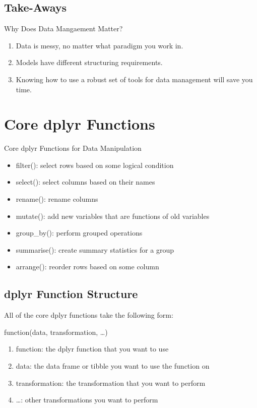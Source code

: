 \documentclass[]{book}
\providecommand{\tightlist}{%
  \setlength{\itemsep}{0pt}\setlength{\parskip}{0pt}}
\theoremstyle{definition}
\theoremstyle{definition}
\theoremstyle{definition}
\theoremstyle{remark}
\begin{document}
\hypertarget{take-aways}{%
\section{Take-Aways}\label{take-aways}}

Why Does Data Mangaement Matter?

\begin{enumerate}
\def\labelenumi{\arabic{enumi}.}
\tightlist
\item
  Data is messy, no matter what paradigm you work in.
\item
  Models have different structuring requirements.
\item
  Knowing how to use a robust set of tools for data management will save you time.
\end{enumerate}

\hypertarget{core-dplyr-functions}{%
\chapter{Core dplyr Functions}\label{core-dplyr-functions}}

Core dplyr Functions for Data Manipulation

\begin{itemize}
\tightlist
\item
  filter(): select rows based on some logical condition
\item
  select(): select columns based on their names
\item
  rename(): rename columns
\item
  mutate(): add new variables that are functions of old variables
\item
  group\_by(): perform grouped operations
\item
  summarise(): create summary statistics for a group
\item
  arrange(): reorder rows based on some column
\end{itemize}

\hypertarget{form}{%
\section{dplyr Function Structure}\label{form}}

All of the core dplyr functions take the following form:

function(data, transformation, \ldots{})

\begin{enumerate}
\def\labelenumi{\arabic{enumi}.}
\item
  function: the dplyr function that you want to use
\item
  data: the data frame or tibble you want to use the function on
\item
  transformation: the transformation that you want to perform
\item
  \ldots{}: other transformations you want to perform
\end{enumerate}
\end{document}
